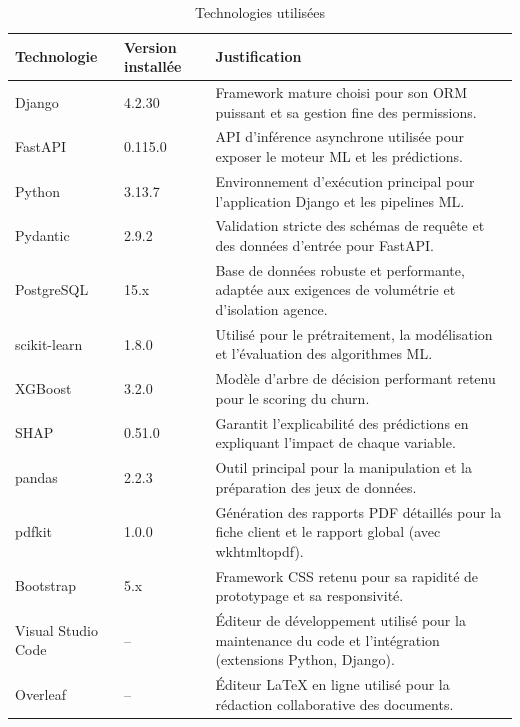 \begin{table}[H]
    \centering
    \caption{Technologies utilisées}
    \label{tab:technologies_analyse}
    \begin{tabular}{|p{3cm}|p{2.5cm}|p{7.8cm}|}
        \hline
        \textbf{Technologie} & \textbf{Version installée}
        & \textbf{Justification} \\
        \hline
        Django & 4.2.30
        & Framework mature choisi pour son ORM puissant et sa gestion fine des permissions. \\
        \hline
        FastAPI & 0.115.0
        & API d'inférence asynchrone utilisée pour exposer le moteur ML et les prédictions. \\
        \hline
        Python & 3.13.7
        & Environnement d'exécution principal pour l'application Django et les pipelines ML. \\
        \hline
        Pydantic & 2.9.2
        & Validation stricte des schémas de requête et des données d'entrée pour FastAPI. \\
        \hline
        PostgreSQL & 15.x
        & Base de données robuste et performante, adaptée aux exigences de volumétrie et d'isolation agence. \\
        \hline
        scikit-learn & 1.8.0
        & Utilisé pour le prétraitement, la modélisation et l'évaluation des algorithmes ML. \\
        \hline
        XGBoost & 3.2.0
        & Modèle d'arbre de décision performant retenu pour le scoring du churn. \\
        \hline
        SHAP & 0.51.0
        & Garantit l'explicabilité des prédictions en expliquant l'impact de chaque variable. \\
        \hline
        pandas & 2.2.3
        & Outil principal pour la manipulation et la préparation des jeux de données. \\
        \hline
        pdfkit & 1.0.0
        & Génération des rapports PDF détaillés pour la fiche client et le rapport global (avec wkhtmltopdf). \\
        \hline
        Bootstrap & 5.x
        & Framework CSS retenu pour sa rapidité de prototypage et sa responsivité. \\
        \hline
        Visual Studio Code & --
        & Éditeur de développement utilisé pour la maintenance du code et l'intégration (extensions Python, Django). \\
        \hline
        Overleaf & --
        & Éditeur LaTeX en ligne utilisé pour la rédaction collaborative des documents. \\

\end{tabular}
\end{table}
